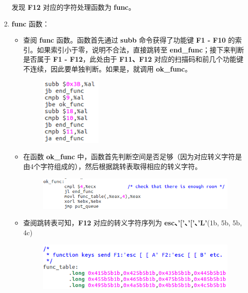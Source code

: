 \begin{enumerate}
\begin{figure}[htbp]
                    \end{figure}
                    \par 发现 \textbf{F12} 对应的字符处理函数为 \textbf{func}。
                \newpage
                \item \textbf{func} 函数：
                    \begin{itemize}
                        \item 查阅 \textbf{func} 函数。函数首先通过 \textbf{subb} 命令获得了功能键 \textbf{F1 - F10} 的索引。如果索引小于零，说明不合法，直接跳转至 \textbf{end\_func}；接下来判断是否属于 \textbf{F1 - F12}，此处由于 \textbf{F11、F12} 对应的扫描码和前几个功能键不连续，因此要单独判断。如果是，就调用 \textbf{ok\_func}。
                            \begin{figure}[htbp]
                                \hspace*{2.3cm}
                                \includegraphics*[width = 3cm]{s0_2.png}
                            \end{figure}
                        \item 在函数 \textbf{ok\_func} 中，函数首先判断空间是否足够（因为对应转义字符是由4个字符组成的），然后根据跳转表取得相应的转义字符。
                            \begin{figure}[htbp]
                                \hspace*{2.3cm}
                                \includegraphics*[width = 12cm]{s0_3.png}
                            \end{figure}
                        \item 查阅跳转表可知，\textbf{F12} 对应的转义字符序列为 \textbf{esc、'['、'['、'L'}(1b, 5b, 5b, 4c)
                            \begin{figure}[htbp]
                                \hspace*{2.3cm}
                                \includegraphics*[width = 10cm]{s0_4.png}

\end{figure}
\end{itemize}
\end{enumerate}
